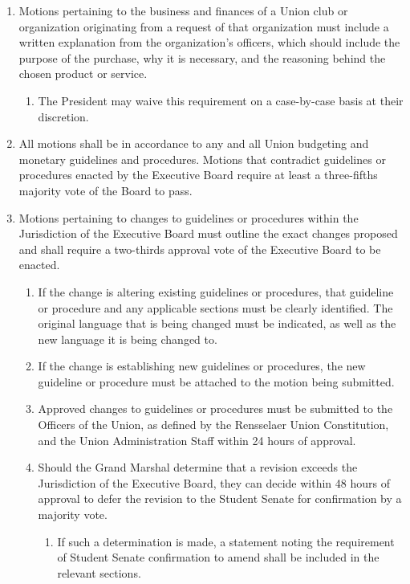 \documentclass{uniondoc}
\begin{document}
\begin{enumerate}
\begin{enumerate}
  \end{enumerate}
\item Motions pertaining to the business and finances of a Union club or organization originating from a request of that organization must include a written explanation from the organization’s officers, which should include the purpose of the purchase, why it is necessary, and the reasoning behind the chosen product or service.
  \begin{enumerate}
  \item The President may waive this requirement on a case-by-case basis at their discretion.
  \end{enumerate}
\item All motions shall be in accordance to any and all Union budgeting and monetary guidelines and procedures. Motions that contradict guidelines or procedures enacted by the Executive Board require at least a three-fifths majority vote of the Board to pass.
\item Motions pertaining to changes to guidelines or procedures within the Jurisdiction of the Executive Board must outline the exact changes proposed and shall require a two-thirds approval vote of the Executive Board to be enacted.
  \begin{enumerate}
  \item If the change is altering existing guidelines or procedures, that guideline or procedure and any applicable sections must be clearly identified. The original language that is being changed must be indicated, as well as the new language it is being changed to.
  \item If the change is establishing new guidelines or procedures, the new guideline or procedure must be attached to the motion being submitted.
  \item Approved changes to guidelines or procedures must be submitted to the Officers of the Union, as defined by the Rensselaer Union Constitution, and the Union Administration Staff within 24 hours of approval.
  \item Should the Grand Marshal determine that a revision exceeds the Jurisdiction of the Executive Board, they can decide within 48 hours of approval to defer the revision to the Student Senate for confirmation by a majority vote.
    \begin{enumerate}
    \item If such a determination is made, a statement noting the requirement of Student Senate confirmation to amend shall be included in the relevant sections.

\end{enumerate}
\end{enumerate}
\end{enumerate}
\end{document}
